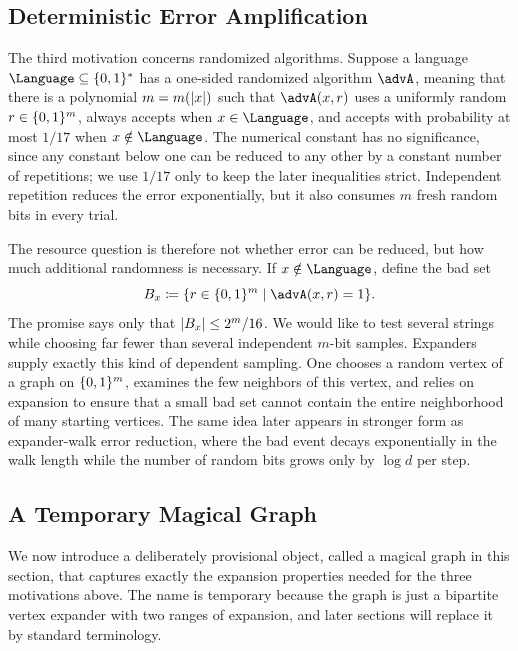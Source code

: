 \subsection{Deterministic Error Amplification}
\label{subsec:motivating-deterministic-error-amplification}

The third motivation concerns randomized algorithms. Suppose a language \(\Language\subseteq\bits^*\) has a one-sided randomized algorithm \(\advA\), meaning that there is a polynomial \(m=m(\lvert x\rvert)\) such that \(\advA(x,r)\) uses a uniformly random \(r\in\{0,1\}^m\), always accepts when \(x\in \Language\), and accepts with probability at most \(1/17\) when \(x\notin \Language\). The numerical constant has no significance, since any constant below one can be reduced to any other by a constant number of repetitions; we use \(1/17\) only to keep the later inequalities strict. Independent repetition reduces the error exponentially, but it also consumes \(m\) fresh random bits in every trial.

The resource question is therefore not whether error can be reduced, but how much additional randomness is necessary. If \(x\notin \Language\), define the bad set
\begin{equation}
	\label{eq:rp-bad-random-strings}
	B_x\coloneqq \{r\in\bits^m\mid \advA(x,r)=1\}.
\end{equation}
The promise says only that \(\lvert B_x\rvert\leq 2^m/16\). We would like to test several strings while choosing far fewer than several independent \(m\)-bit samples. Expanders supply exactly this kind of dependent sampling. One chooses a random vertex of a graph on \(\{0,1\}^m\), examines the few neighbors of this vertex, and relies on expansion to ensure that a small bad set cannot contain the entire neighborhood of many starting vertices. The same idea later appears in stronger form as expander-walk error reduction, where the bad event decays exponentially in the walk length while the number of random bits grows only by \(\log d\) per step.

\subsection{A Temporary Magical Graph}
\label{subsec:temporary-magical-graph}

We now introduce a deliberately provisional object, called a magical graph in this section, that captures exactly the expansion properties needed for the three motivations above. The name is temporary because the graph is just a bipartite vertex expander with two ranges of expansion, and later sections will replace it by standard terminology.


